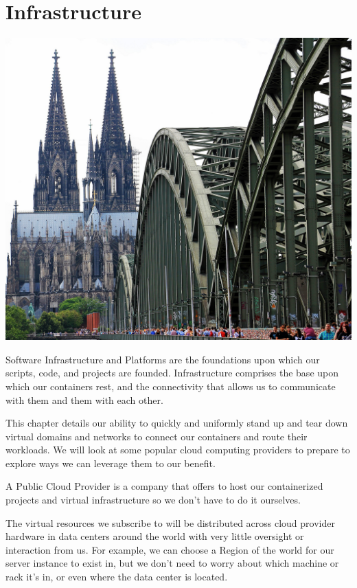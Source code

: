 \chapter{Infrastructure}

\justify{}
\includegraphics{../images/cologne-cathedral-1507854_1920.jpg}

\justify{}
Software Infrastructure and Platforms are the foundations upon which our
scripts, code, and projects are founded. Infrastructure comprises the
base upon which our containers rest, and the connectivity that allows us
to communicate with them and them with each other.

\justify{}
This chapter details our ability to quickly and uniformly stand up and
tear down virtual domains and networks to connect our containers and
route their workloads. We will look at some popular cloud computing
providers to prepare to explore ways we can leverage them to our
benefit.

\justify{}
A Public Cloud Provider is a company that offers to host our containerized
projects and virtual infrastructure so we don't have to do it ourselves.

\justify{}
The virtual resources we subscribe to will be distributed across cloud
provider hardware in data centers around the world with very little
oversight or interaction from us. For example, we can choose a Region of
the world for our server instance to exist in, but we don't need to
worry about which machine or rack it's in, or even where the data center
is located.


